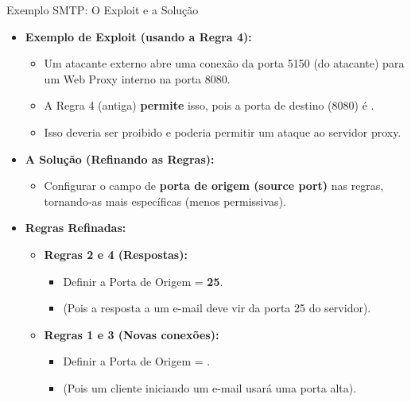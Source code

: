 \begin{frame}{Exemplo SMTP: O Exploit e a Solução}
    \begin{itemize}
        \item \textbf{Exemplo de Exploit (usando a Regra 4):}
              \begin{itemize}
                  \item Um atacante externo abre uma conexão da porta 5150 (do atacante) para um Web Proxy interno na porta 8080.
                  \item A Regra 4 (antiga) \textbf{permite} isso, pois a porta de destino (8080) é .
                  \item Isso deveria ser proibido e poderia permitir um ataque ao servidor proxy.
              \end{itemize}

        \item \textbf{A Solução (Refinando as Regras):}
              \begin{itemize}
                  \item Configurar o campo de \textbf{porta de origem (source port)} nas regras, tornando-as mais específicas (menos permissivas).
              \end{itemize}

        \item \textbf{Regras Refinadas:}
              \begin{itemize}
                  \item \textbf{Regras 2 e 4 (Respostas):}
                        \begin{itemize}
                            \item Definir a Porta de Origem = \textbf{25}.
                            \item (Pois a resposta a um e-mail deve vir da porta 25 do servidor).
                        \end{itemize}
                  \item \textbf{Regras 1 e 3 (Novas conexões):}
                        \begin{itemize}
                            \item Definir a Porta de Origem = \textbf{}.
                            \item (Pois um cliente iniciando um e-mail usará uma porta alta).
                        \end{itemize}
              \end{itemize}
    \end{itemize}
\end{frame}

